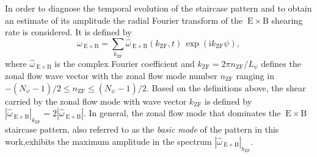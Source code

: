 \documentclass[aip, amsmath, amssymb, reprint, twocolumn]{revtex4-1}
\newcommand{\wexb}{\omega_{\mathrm{\:E \times B}}}
\newcommand{\hatwexb}{\widehat{\omega}_{\mathrm{\:E \times B}}}
\newcommand{\exb}{\mathrm{\:E}\times\mathrm{B}}
\newcommand{\nzf}{n_\mathrm{ZF}}
\newcommand{\kzf}{k_\mathrm{ZF}}
\begin{document}
In order to diagnose the temporal evolution of the staircase pattern and to obtain an estimate of its amplitude the radial Fourier transform of the $\exb$ shearing rate is considered. 
It is defined by
\begin{equation}
	\wexb = \sum_{\kzf} \hatwexb(\kzf,t) \, \exp(\mathrm{i} \kzf \psi),
	\label{eq:shearingrate_fourier}
\end{equation}
where $\hatwexb$ is the complex Fourier coefficient and \linebreak $\kzf = 2\pi \nzf/L_\psi$
defines the zonal flow wave vector with the zonal flow mode number $\nzf$ ranging in $-(N_\psi -1)/2 \leq \nzf \leq (N_\psi -1)/2 $.
Based on the definitions above, the shear carried by the zonal flow mode with wave vector $\kzf$ is defined by $|\hatwexb|_{\kzf} = 2 |\hatwexb|$. 
In general, the zonal flow mode that dominates the $\exb$ staircase pattern, also referred to as the \textit{basic mode} of the pattern in this work,exhibits the maximum amplitude in the spectrum $|\hatwexb|_{\kzf}$. \bigskip



\end{document}
